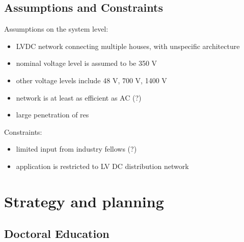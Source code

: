 \documentclass[]{scrreprt}
\begin{document}
\section{Assumptions and Constraints}

Assumptions on the system level:
\begin{itemize}
	\item LVDC network connecting multiple houses, with unspecific architecture 
	\item nominal voltage level is assumed to be 350 V
	\item other voltage levels include 48 V, 700 V, 1400 V
	\item network is at least as efficient as AC (?)
	\item large penetration of res
\end{itemize}

Constraints:
\begin{itemize}
	\item limited input from industry fellows (?)
	\item application is restricted to LV DC distribution network
\end{itemize}






\chapter{Strategy and planning}






\section{Doctoral Education}
\end{document}
